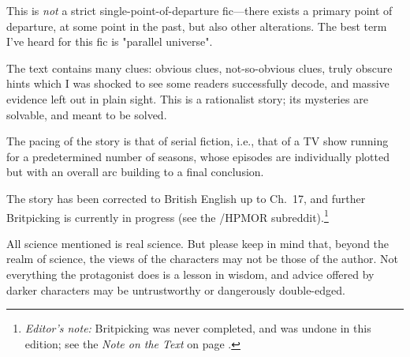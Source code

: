 This is \emph{not} a strict single-point-of-departure fic---there exists a
primary point of departure, at some point in the past, but also other
alterations. The best term I've heard for this fic is "parallel universe".

The text contains many clues: obvious clues, not-so-obvious clues, truly
obscure hints which I was shocked to see some readers successfully decode, and
massive evidence left out in plain sight. This is a rationalist story; its
mysteries are solvable, and meant to be solved.

The pacing of the story is that of serial fiction, i.e., that of a TV show
running for a predetermined number of seasons, whose episodes are individually
plotted but with an overall arc building to a final conclusion.

The story has been corrected to British English up to Ch.~17, and further
Britpicking is currently in progress (see the /HPMOR
subreddit).\footnote{\emph{Editor's note:} Britpicking was never completed, and
    was undone in this edition; see the \emph{Note on the Text} on page
    \pageref{britpick note}.}

All science mentioned is real science. But please keep in mind that, beyond the
realm of science, the views of the characters may not be those of the author.
Not everything the protagonist does is a lesson in wisdom, and advice offered
by darker characters may be untrustworthy or dangerously double-edged.
